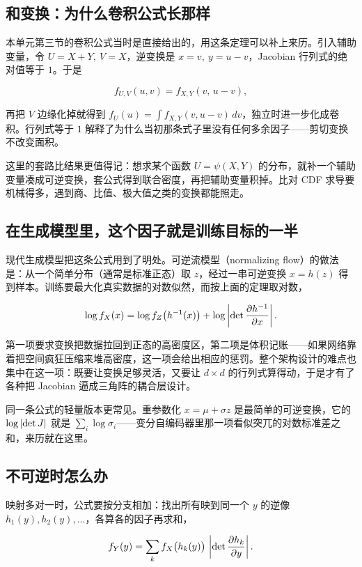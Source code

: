 \subsection{和变换：为什么卷积公式长那样}

本单元第三节的卷积公式当时是直接给出的，用这条定理可以补上来历。引入辅助变量，令 \(U=X+Y,\ V=X\)，逆变换是 \(x=v,\ y=u-v\)，Jacobian 行列式的绝对值等于 \(1\)。于是

\[
f_{U,V}(u,v)=f_{X,Y}(v,\,u-v),
\]

再把 \(V\) 边缘化掉就得到 \(f_U(u)=\int f_{X,Y}(v,u-v)\,dv\)，独立时进一步化成卷积。行列式等于 \(1\) 解释了为什么当初那条式子里没有任何多余因子——剪切变换不改变面积。

这里的套路比结果更值得记：想求某个函数 \(U=\psi(X,Y)\) 的分布，就补一个辅助变量凑成可逆变换，套公式得到联合密度，再把辅助变量积掉。比对 CDF 求导要机械得多，遇到商、比值、极大值之类的变换都能照走。

\subsection{在生成模型里，这个因子就是训练目标的一半}

现代生成模型把这条公式用到了明处。可逆流模型（normalizing flow）的做法是：从一个简单分布（通常是标准正态）取 \(z\)，经过一串可逆变换 \(x=h(z)\) 得到样本。训练要最大化真实数据的对数似然，而按上面的定理取对数，

\[
\log f_X(x)=\log f_Z\bigl(h^{-1}(x)\bigr)+\log\left|\det \frac{\partial h^{-1}}{\partial x}\right| .
\]

第一项要求变换把数据拉回到正态的高密度区，第二项是体积记账——如果网络靠着把空间疯狂压缩来堆高密度，这一项会给出相应的惩罚。整个架构设计的难点也集中在这一项：既要让变换足够灵活，又要让 \(d\times d\) 的行列式算得动，于是才有了各种把 Jacobian 逼成三角阵的耦合层设计。

同一条公式的轻量版本更常见。重参数化 \(x=\mu+\sigma z\) 是最简单的可逆变换，它的 \(\log\left|\det J\right|\) 就是 \(\sum_i\log\sigma_i\)——变分自编码器里那一项看似突兀的对数标准差之和，来历就在这里。

\subsection{不可逆时怎么办}

映射多对一时，公式要按分支相加：找出所有映到同一个 \(y\) 的逆像 \(h_1(y),h_2(y),\ldots\)，各算各的因子再求和，

\[
f_Y(y)=\sum_k f_X\bigl(h_k(y)\bigr)\,\left|\det \frac{\partial h_k}{\partial y}\right| .
\]

